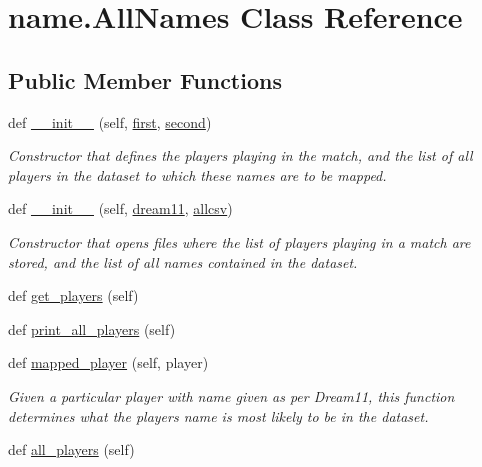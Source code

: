 \hypertarget{classname_1_1AllNames}{}\section{name.\+All\+Names Class Reference}
\label{classname_1_1AllNames}
\subsection*{Public Member Functions}
\begin{DoxyCompactItemize}
\item 
def \hyperlink{classname_1_1AllNames_ac3662eb1bdbc32f6a3baa780a8d6a18c}{\+\_\+\+\_\+init\+\_\+\+\_\+} (self, \hyperlink{classname_1_1AllNames_af05034a1d261190ebd396ee615052d8e}{first}, \hyperlink{classname_1_1AllNames_a414e627444762afcc47ead0015f1dcce}{second})
\begin{DoxyCompactList}\small\item\em Constructor that defines the players playing in the match, and the list of all players in the dataset to which these names are to be mapped. \end{DoxyCompactList}\item 
def \hyperlink{classname_1_1AllNames_a28c4e3248f60738f445089b1fe8dfe42}{\+\_\+\+\_\+init\+\_\+\+\_\+} (self, \hyperlink{classname_1_1AllNames_a3fe1dd6f5e33b95faf2eca8d8dce3cc1}{dream11}, \hyperlink{classname_1_1AllNames_a1c94841db2dd8ff636014a0029e11673}{allcsv})
\begin{DoxyCompactList}\small\item\em Constructor that opens files where the list of players playing in a match are stored, and the list of all names contained in the dataset. \end{DoxyCompactList}\item 
def \hyperlink{classname_1_1AllNames_a766b1d340e8df73fa313e7ceec65c150}{get\+\_\+players} (self)
\item 
def \hyperlink{classname_1_1AllNames_a224ad6b8dff67b909fd7bddfdbe0244f}{print\+\_\+all\+\_\+players} (self)
\item 
def \hyperlink{classname_1_1AllNames_a9cd51d0c9394ed62cfc62c688dc5434f}{mapped\+\_\+player} (self, player)
\begin{DoxyCompactList}\small\item\em Given a particular player with name given as per Dream11, this function determines what the player\textquotesingle{}s name is most likely to be in the dataset. \end{DoxyCompactList}\item 
def \hyperlink{classname_1_1AllNames_a9de21d794d9868b1d42fb103f6643ba7}{all\+\_\+players} (self)
\end{DoxyCompactItemize}
